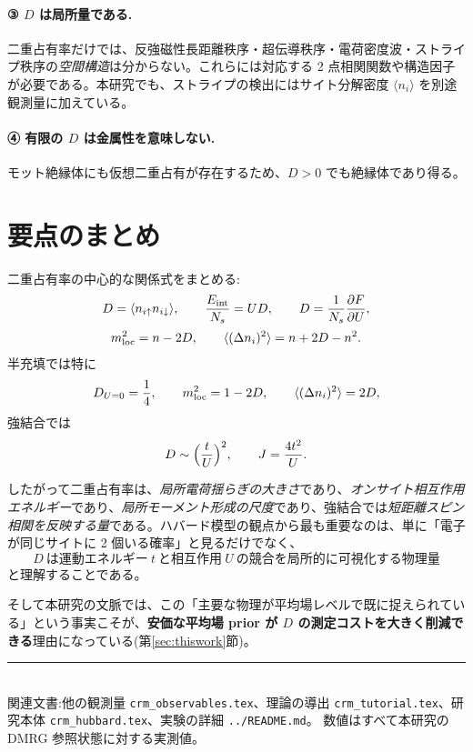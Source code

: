 \documentclass[11pt,a4paper]{ltjsarticle}
\newcommand{\ev}[1]{\langle #1\rangle}
\newcommand{\up}{\uparrow}
\newcommand{\dn}{\downarrow}
\begin{document}
\paragraph{③ $D$ は局所量である.}二重占有率だけでは、反強磁性長距離秩序・超伝導秩序・電荷密度波・ストライプ秩序の\emph{空間構造}は分からない。これらには対応する 2 点相関関数や構造因子が必要である。本研究でも、ストライプの検出にはサイト分解密度 $\ev{n_i}$ を別途観測量に加えている。

\paragraph{④ 有限の $D$ は金属性を意味しない.}モット絶縁体にも仮想二重占有が存在するため、$D>0$ でも絶縁体であり得る。

\section{要点のまとめ}

二重占有率の中心的な関係式をまとめる:
\begin{gather}
  D = \ev{n_{i\up}n_{i\dn}},\qquad
  \frac{E_{\rm int}}{N_s} = UD,\qquad
  D = \frac{1}{N_s}\frac{\partial F}{\partial U},\\[2pt]
  m_{\rm loc}^2 = n-2D,\qquad
  \ev{(\Delta n_i)^2} = n+2D-n^2.
\end{gather}
半充填では特に
\begin{equation}
  D_{U=0}=\frac14,\qquad m_{\rm loc}^2 = 1-2D,\qquad \ev{(\Delta n_i)^2}=2D,
\end{equation}
強結合では
\begin{equation}
  D\sim\Bigl(\frac{t}{U}\Bigr)^2,\qquad J=\frac{4t^2}{U}.
\end{equation}

したがって二重占有率は、\emph{局所電荷揺らぎの大きさ}であり、\emph{オンサイト相互作用エネルギー}であり、\emph{局所モーメント形成の尺度}であり、強結合では\emph{短距離スピン相関を反映する量}である。ハバード模型の観点から最も重要なのは、単に「電子が同じサイトに 2 個いる確率」と見るだけでなく、
\begin{equation}
  \boxed{\ D\ \text{は運動エネルギー}\ t\ \text{と相互作用}\ U\ \text{の競合を局所的に可視化する物理量}\ }
\end{equation}
と理解することである。

そして本研究の文脈では、この「主要な物理が平均場レベルで既に捉えられている」という事実こそが、\textbf{安価な平均場 prior が $D$ の測定コストを大きく削減できる}理由になっている(第\ref{sec:thiswork}節)。

\vfill
\noindent\rule{\linewidth}{0.4pt}\\
\footnotesize 関連文書:他の観測量 \texttt{crm\_observables.tex}、理論の導出 \texttt{crm\_tutorial.tex}、研究本体 \texttt{crm\_hubbard.tex}、実験の詳細 \texttt{../README.md}。
数値はすべて本研究の DMRG 参照状態に対する実測値。
\end{document}
